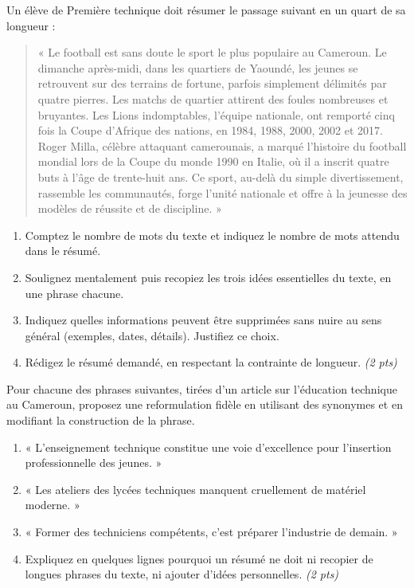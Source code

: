 \documentclass[11pt]{article}
\begin{document}
\begin{exercice}
Un élève de Première technique doit résumer le passage suivant en un quart de sa longueur :
\begin{quote}
« Le football est sans doute le sport le plus populaire au Cameroun. Le dimanche après-midi, dans les quartiers de Yaoundé, les jeunes se retrouvent sur des terrains de fortune, parfois simplement délimités par quatre pierres. Les matchs de quartier attirent des foules nombreuses et bruyantes. Les Lions indomptables, l'équipe nationale, ont remporté cinq fois la Coupe d'Afrique des nations, en 1984, 1988, 2000, 2002 et 2017. Roger Milla, célèbre attaquant camerounais, a marqué l'histoire du football mondial lors de la Coupe du monde 1990 en Italie, où il a inscrit quatre buts à l'âge de trente-huit ans. Ce sport, au-delà du simple divertissement, rassemble les communautés, forge l'unité nationale et offre à la jeunesse des modèles de réussite et de discipline. »
\end{quote}
\begin{enumerate}
\item Comptez le nombre de mots du texte et indiquez le nombre de mots attendu dans le résumé.
\item Soulignez mentalement puis recopiez les trois idées essentielles du texte, en une phrase chacune.
\item Indiquez quelles informations peuvent être supprimées sans nuire au sens général (exemples, dates, détails). Justifiez ce choix.
\item Rédigez le résumé demandé, en respectant la contrainte de longueur. \textit{(2 pts)}
\end{enumerate}
\end{exercice}

\begin{exercice}
Pour chacune des phrases suivantes, tirées d'un article sur l'éducation technique au Cameroun, proposez une reformulation fidèle en utilisant des synonymes et en modifiant la construction de la phrase.
\begin{enumerate}
\item « L'enseignement technique constitue une voie d'excellence pour l'insertion professionnelle des jeunes. »
\item « Les ateliers des lycées techniques manquent cruellement de matériel moderne. »
\item « Former des techniciens compétents, c'est préparer l'industrie de demain. »
\item Expliquez en quelques lignes pourquoi un résumé ne doit ni recopier de longues phrases du texte, ni ajouter d'idées personnelles. \textit{(2 pts)}
\end{enumerate}
\end{exercice}
\end{document}
